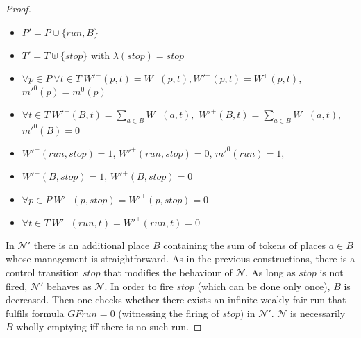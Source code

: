 \begin{proof}
\begin{itemize}
%
	\item $P'=P\uplus \{run,B\}$
%
	\item $T'=T\uplus \{stop\}$ with $\lambda(stop)=stop$
%
	\item $\forall p \in P\ \forall t \in T\ W'^-(p,t)=W^-(p,t), W'^+(p,t)=W^+(p,t)$, $m'^0(p)=m^0(p)$
%
	\item $\forall t \in T\ W'^-(B,t)=\sum_{a\in B} W^-(a,t),$
	$W'^+(B,t)=\sum_{a\in B} W^+(a,t)$, $m'^0(B)=0$
%
	\item $W'^-(run,stop)=1$, $W'^+(run,stop)=0$, $m'^0(run)=1$,
%
	\item $W'^-(B,stop)=1$, $W'^+(B,stop)=0$
%
	\item $\forall p \in P\  W'^-(p,stop)=W'^+(p,stop)=0$
%
	\item $\forall t \in T\  W'^-(run,t)=W'^+(run,t)=0$
%
\end{itemize}


In $\mathcal N'$ there is an additional place $B$ containing the sum of tokens
of places $a \in B$ whose management is straightforward.
As in the previous constructions, there is a control transition
$stop$ that modifies the behaviour of $\mathcal N$. As long
as $stop$ is not fired, $\mathcal N'$ behaves as $\mathcal N$.
In order to fire $stop$ (which can be done only once), $B$ is decreased. 
Then one checks whether there exists an infinite weakly fair run 
that fulfils formula $GF run=0$ (witnessing the firing of $stop$) in
$\mathcal N'$. 
$\mathcal N$ is necessarily $B$-wholly emptying 
iff there is no such run. 
\end{proof}


